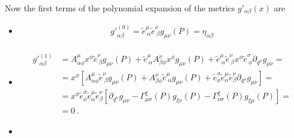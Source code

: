 \documentclass[letterpaper,10pt,english]{jupyterBook}
\begin{document}
\sphinxAtStartPar
Now the first terms of the polynomial expansion of the metrics \(g'_{\alpha \beta}(x)\) are
\begin{itemize}
\item {} 
\sphinxAtStartPar
{}
\begin{equation*}
\begin{split}{g'}_{\alpha \beta}^{(0)} = \widetilde{e}^{\mu}_{\ \alpha} \widetilde{e}^{\nu}_{\ \beta} g_{\mu \nu}(P) = \eta_{\alpha \beta}\end{split}
\end{equation*}
\item {} 
\sphinxAtStartPar
{}
\begin{equation*}
\begin{split}\begin{aligned}
   {g'}_{\alpha \beta}^{(1)} & =
   A^{\mu}_{\alpha \phi} x^\phi \widetilde{e}^{\nu}_{\ \beta} g_{\mu \nu}(P) +
   \widetilde{e}^{\mu}_{\ \alpha} A^{\nu}_{\beta \phi} x^\phi g_{\mu \nu}(P) +
   \widetilde{e}^{\mu}_{\ \alpha} \widetilde{e}^{\nu}_{\ \beta} x^\phi \widetilde{e}^{\sigma}_{\ \phi} \partial_{q^\sigma} g_{\mu \nu} = \\
   & = x^{\phi} \left[ A^{\mu}_{\alpha \phi} \widetilde{e}^{\nu}_{\ \beta} g_{\mu \nu}(P) + A^{\nu}_{\beta \phi} \widetilde{e}^{\mu}_{\ \alpha} g_{\mu \nu}(P) + \widetilde{e}^{\sigma}_{\phi} \widetilde{e}^{\mu}_{\alpha} \widetilde{e}^{\nu}_{\beta} \partial_{q^\sigma} g_{\mu \nu} \right] = \\
   & = x^{\phi} \widetilde{e}^{\sigma}_{\phi} \widetilde{e}^{\mu}_{\alpha} \widetilde{e}^{\nu}_{\beta} \left[ \partial_{q^\sigma} g_{\mu \nu} - \Gamma^{\xi}_{\mu \sigma}(P) g_{\xi \nu}(P) - \Gamma^{\xi}_{\nu \sigma}(P) g_{\xi \mu}(P) \right] = \\
   & = 0 \ .
   \end{aligned}\end{split}
\end{equation*}
\item {} 
\sphinxAtStartPar
{}

\end{itemize}
\end{document}
